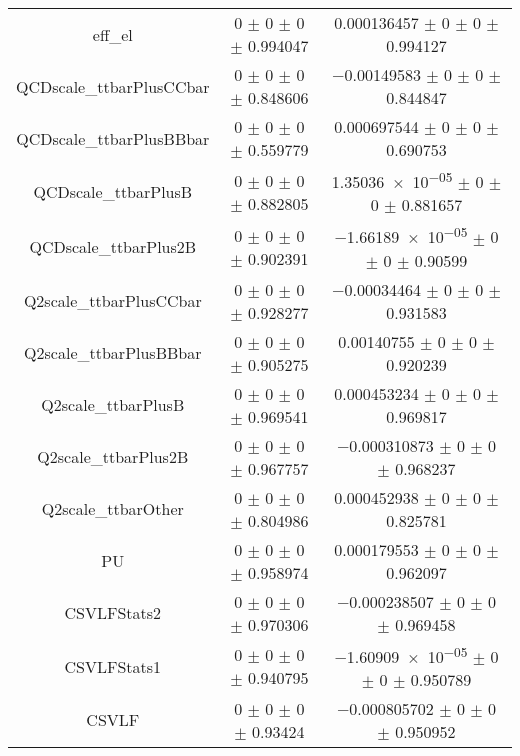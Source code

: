 \begin{table}
\begin{tabular}{ccc}
eff\_el 	& \num{0} $\pm$ \num{0} $\pm$ \num{0} $\pm$ \num{0.994047} 	& \num{0.000136457} $\pm$ \num{0} $\pm$ \num{0} $\pm$ \num{0.994127}\\
QCDscale\_ttbarPlusCCbar 	& \num{0} $\pm$ \num{0} $\pm$ \num{0} $\pm$ \num{0.848606} 	& \num{-0.00149583} $\pm$ \num{0} $\pm$ \num{0} $\pm$ \num{0.844847}\\
QCDscale\_ttbarPlusBBbar 	& \num{0} $\pm$ \num{0} $\pm$ \num{0} $\pm$ \num{0.559779} 	& \num{0.000697544} $\pm$ \num{0} $\pm$ \num{0} $\pm$ \num{0.690753}\\
QCDscale\_ttbarPlusB 	& \num{0} $\pm$ \num{0} $\pm$ \num{0} $\pm$ \num{0.882805} 	& \num{1.35036e-05} $\pm$ \num{0} $\pm$ \num{0} $\pm$ \num{0.881657}\\
QCDscale\_ttbarPlus2B 	& \num{0} $\pm$ \num{0} $\pm$ \num{0} $\pm$ \num{0.902391} 	& \num{-1.66189e-05} $\pm$ \num{0} $\pm$ \num{0} $\pm$ \num{0.90599}\\
Q2scale\_ttbarPlusCCbar 	& \num{0} $\pm$ \num{0} $\pm$ \num{0} $\pm$ \num{0.928277} 	& \num{-0.00034464} $\pm$ \num{0} $\pm$ \num{0} $\pm$ \num{0.931583}\\
Q2scale\_ttbarPlusBBbar 	& \num{0} $\pm$ \num{0} $\pm$ \num{0} $\pm$ \num{0.905275} 	& \num{0.00140755} $\pm$ \num{0} $\pm$ \num{0} $\pm$ \num{0.920239}\\
Q2scale\_ttbarPlusB 	& \num{0} $\pm$ \num{0} $\pm$ \num{0} $\pm$ \num{0.969541} 	& \num{0.000453234} $\pm$ \num{0} $\pm$ \num{0} $\pm$ \num{0.969817}\\
Q2scale\_ttbarPlus2B 	& \num{0} $\pm$ \num{0} $\pm$ \num{0} $\pm$ \num{0.967757} 	& \num{-0.000310873} $\pm$ \num{0} $\pm$ \num{0} $\pm$ \num{0.968237}\\
Q2scale\_ttbarOther 	& \num{0} $\pm$ \num{0} $\pm$ \num{0} $\pm$ \num{0.804986} 	& \num{0.000452938} $\pm$ \num{0} $\pm$ \num{0} $\pm$ \num{0.825781}\\
PU 	& \num{0} $\pm$ \num{0} $\pm$ \num{0} $\pm$ \num{0.958974} 	& \num{0.000179553} $\pm$ \num{0} $\pm$ \num{0} $\pm$ \num{0.962097}\\
CSVLFStats2 	& \num{0} $\pm$ \num{0} $\pm$ \num{0} $\pm$ \num{0.970306} 	& \num{-0.000238507} $\pm$ \num{0} $\pm$ \num{0} $\pm$ \num{0.969458}\\
CSVLFStats1 	& \num{0} $\pm$ \num{0} $\pm$ \num{0} $\pm$ \num{0.940795} 	& \num{-1.60909e-05} $\pm$ \num{0} $\pm$ \num{0} $\pm$ \num{0.950789}\\
CSVLF 	& \num{0} $\pm$ \num{0} $\pm$ \num{0} $\pm$ \num{0.93424} 	& \num{-0.000805702} $\pm$ \num{0} $\pm$ \num{0} $\pm$ \num{0.950952}\\

\end{tabular}
\end{table}
